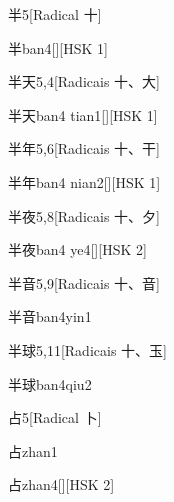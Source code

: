 \begin{entry}{半}{5}[Radical ⼗]
  \begin{phonetics}{半}{ban4}[][HSK 1]
  \end{phonetics}
\end{entry}

\begin{entry}{半天}{5,4}[Radicais ⼗、⼤]
  \begin{phonetics}{半天}{ban4 tian1}[][HSK 1]
  \end{phonetics}
\end{entry}

\begin{entry}{半年}{5,6}[Radicais ⼗、⼲]
  \begin{phonetics}{半年}{ban4 nian2}[][HSK 1]
  \end{phonetics}
\end{entry}

\begin{entry}{半夜}{5,8}[Radicais ⼗、⼣]
  \begin{phonetics}{半夜}{ban4 ye4}[][HSK 2]
  \end{phonetics}
\end{entry}

\begin{entry}{半音}{5,9}[Radicais ⼗、⾳]
  \begin{phonetics}{半音}{ban4yin1}
  \end{phonetics}
\end{entry}

\begin{entry}{半球}{5,11}[Radicais ⼗、⽟]
  \begin{phonetics}{半球}{ban4qiu2}
  \end{phonetics}
\end{entry}

\begin{entry}{占}{5}[Radical ⼘]
  \begin{phonetics}{占}{zhan1}
  \end{phonetics}
  \begin{phonetics}{占}{zhan4}[][HSK 2]
  \end{phonetics}
\end{entry}

